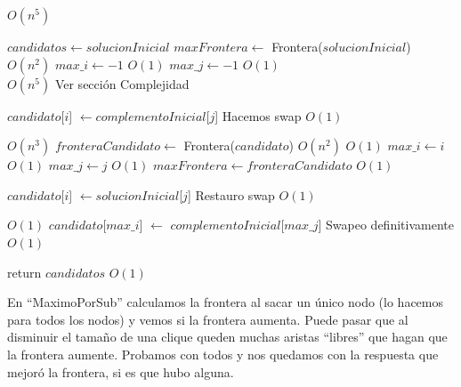 \begin{algorithm}[H]
\begin{algorithmic}
   \Comment $O(n^5)$

    \State $candidatos \gets solucionInicial$
    \State $maxFrontera \gets$ Frontera($solucionInicial$)  \Comment $O(n^2)$
    \State $max\_i \gets -1$                                \Comment $O(1)$
    \State $max\_j \gets -1$                                \Comment $O(1)$\\

    \For{$i \in [0..|solucionInicial|)$}                    \Comment $O(n^5)$ Ver sección Complejidad
        \For{$j \in [0..|complementoInicial|)$}

            \State $candidato$[$i$] $\gets complementoInicial$[$j$] \Comment Hacemos swap $O(1)$

                                                     \Comment $O(n^3)$
                \State $fronteraCandidato \gets$ Frontera($candidato$)          \Comment $O(n^2)$
                                          \Comment $O(1)$
                    \State $max\_i \gets i$                                     \Comment $O(1)$
                    \State $max\_j \gets j$                                     \Comment $O(1)$
                    \State $maxFrontera \gets fronteraCandidato$                \Comment $O(1)$
                \EndIf
            \EndIf

            \State $candidato$[$i$] $\gets solucionInicial$[$j$] \Comment Restauro swap $O(1)$
        \EndFor
    \EndFor

                               \Comment $O(1)$
        \State $candidato$[$max\_i$] $\gets$ $complementoInicial$[$max\_j$] \Comment Swapeo definitivamente $O(1)$
    \EndIf

    \State return $candidatos$                      \Comment $O(1)$

\EndFunction
\end{algorithmic}
\end{algorithm}

En ``MaximoPorSub'' calculamos la frontera al sacar un único nodo (lo hacemos para todos los nodos) y vemos si la frontera aumenta. Puede pasar que al disminuir el tamaño de una clique queden muchas aristas ``libres'' que hagan que la frontera aumente. Probamos con todos y nos quedamos con la respuesta que mejoró la frontera, si es que hubo alguna.

